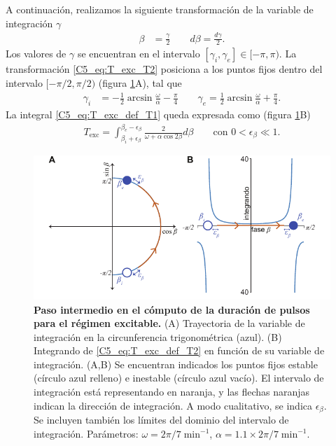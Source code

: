 \documentclass[./main.tex]{subfiles}
\begin{document}
A continuación, realizamos la siguiente transformación de la variable de integración $\gamma$
\begin{align}
    \beta &= \frac{\gamma}{2} \qquad
    d\beta = \frac{d\gamma}{2}.
    \label{C5_eq:T_exc_T2}
\end{align}
Los valores de $\gamma$ se encuentran en el intervalo $[\gamma_i,\gamma_e] \in [-\pi, \pi)$. La transformación \ref{C5_eq:T_exc_T2} posiciona a los puntos fijos dentro del intervalo $[-\pi/2,\pi/2)$ (figura \ref{C5_fig:T_exc_T2}A), tal que
\begin{align}
    \gamma_i &= - \frac{1}{2} \arcsin{\frac{\omega}{\alpha}} - \frac{\pi}{4} \qquad
    \gamma_e  = \frac{1}{2} \arcsin{\frac{\omega}{\alpha}} + \frac{\pi}{4}.
\end{align}
La integral \ref{C5_eq:T_exc_def_T1} queda expresada como (figura \ref{C5_fig:T_exc_T2}B)
\begin{align}
    T_{\text{exc}} = \int_{\beta_i+\epsilon_\beta}^{\beta_e-\epsilon_\beta}  \frac{2}{\omega + \alpha \cos{2 \beta}} d\beta \qquad \text{con } 0< \epsilon_\beta \ll 1.
    \label{C5_eq:T_exc_def_T2}
\end{align}

 \begin{figure}
    \centering
    \includegraphics[width=1\columnwidth]{figures/chapter5/C5_T_exc_T2.pdf} 
    \caption{\textbf{Paso intermedio en el cómputo de la duración de pulsos para el régimen excitable.} (A) Trayectoria de la variable de integración en la circunferencia trigonométrica (azul). (B) Integrando de \ref{C5_eq:T_exc_def_T2} en función de su variable de integración. (A,B) Se encuentran indicados los puntos fijos estable \xxe (círculo azul relleno) e inestable \xxi (círculo azul vacío). El intervalo de integración está representando en naranja, y  las flechas naranjas indican la dirección de integración. A modo cualitativo, se indica $\epsilon_\beta$. Se incluyen también los límites del dominio del intervalo de integración. Parámetros: $\omega=2\pi/7\;\text{min}^{-1}$, $\alpha = 1.1 \times 2\pi/7\;\text{min}^{-1}$.}
    \label{C5_fig:T_exc_T2}
\end{figure}
\end{document}
